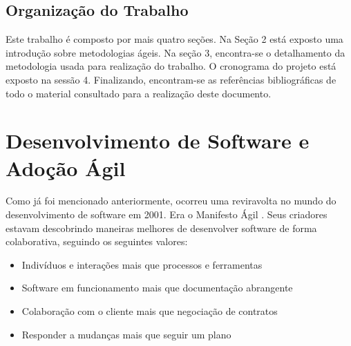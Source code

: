\documentclass[a4paper,11pt]{article}
\begin{document}
\subsection{Organização do Trabalho}
Este trabalho é composto por mais quatro seções. Na Seção 2 está exposto uma introdução sobre metodologias ágeis. Na seção 3,  encontra-se o detalhamento da metodologia usada para realização do trabalho. O cronograma do projeto está exposto na sessão 4. Finalizando, encontram-se as referências bibliográficas de todo o material consultado para a realização deste documento.

\section{Desenvolvimento de Software e Adoção Ágil}
Como já foi mencionado anteriormente, ocorreu uma reviravolta no mundo do desenvolvimento de software em 2001. Era o Manifesto Ágil \cite{agileManifesto}. Seus criadores estavam descobrindo maneiras melhores de desenvolver software de forma colaborativa, seguindo os seguintes valores:
\begin{itemize}
	\item Indivíduos e interações mais que processos e ferramentas
	\item Software em funcionamento mais que documentação abrangente
	\item Colaboração com o cliente mais que negociação de contratos
	\item Responder a mudanças mais que seguir um plano
\end{itemize}
\end{document}
